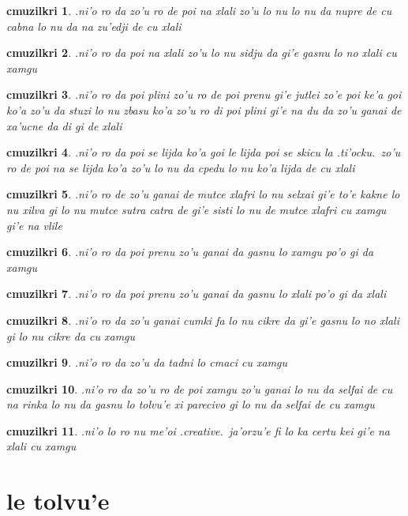 \documentclass{report}
\newtheorem{cmuzilkri}{cmuzilkri}
\begin{document}
\begin{cmuzilkri}
	.ni'o ro da zo'u ro de poi na xlali zo'u lo nu lo nu da nupre de cu cabna lo nu da na zu'edji de cu xlali
\end{cmuzilkri}
\begin{cmuzilkri}
	.ni'o ro da poi na xlali zo'u lo nu sidju da gi'e gasnu lo no xlali cu xamgu
\end{cmuzilkri}
\begin{cmuzilkri}
	.ni'o ro da poi plini zo'u ro de poi prenu gi'e jutlei zo'e poi ke'a goi ko'a zo'u da stuzi lo nu zbasu ko'a zo'u ro di poi plini gi'e na du da zo'u ganai de xa'ucne da di gi de xlali
\end{cmuzilkri}
\begin{cmuzilkri}
	.ni'o ro da poi se lijda ko'a goi le lijda poi se skicu la .ti'ocku.\ zo'u ro de poi na se lijda ko'a zo'u lo nu da cpedu lo nu ko'a lijda de cu xlali
\end{cmuzilkri}
\begin{cmuzilkri}
	.ni'o ro de zo'u ganai de mutce xlafri lo nu selxai gi'e to'e kakne lo nu xilva gi lo nu mutce sutra catra de gi'e sisti lo nu de mutce xlafri cu xamgu gi'e na vlile
\end{cmuzilkri}
\begin{cmuzilkri}
	.ni'o ro da poi prenu zo'u ganai da gasnu lo xamgu po'o gi da xamgu
\end{cmuzilkri}
\begin{cmuzilkri}
	.ni'o ro da poi prenu zo'u ganai da gasnu lo xlali po'o gi da xlali
\end{cmuzilkri}
\begin{cmuzilkri}
	.ni'o ro da zo'u ganai cumki fa lo nu cikre da gi'e gasnu lo no xlali gi lo nu cikre da cu xamgu
\end{cmuzilkri}
\begin{cmuzilkri}
	.ni'o ro da zo'u da tadni lo cmaci cu xamgu
\end{cmuzilkri}
\begin{cmuzilkri}
	.ni'o ro da zo'u ro de poi xamgu zo'u ganai lo nu da selfai de cu na rinka lo nu da gasnu lo tolvu'e xi parecivo gi lo nu da selfai de cu xamgu
\end{cmuzilkri}
\begin{cmuzilkri}
	.ni'o lo ro nu me'oi .creative.\ ja'orzu'e fi lo ka certu kei gi'e na xlali cu xamgu
\end{cmuzilkri}

\section{le tolvu'e}
\end{document}
